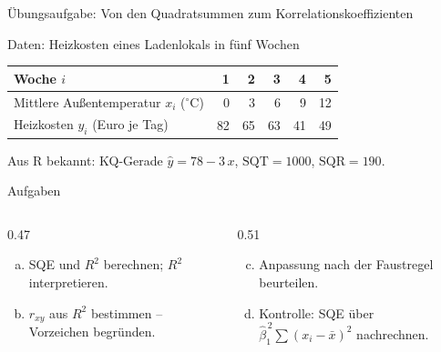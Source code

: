 \documentclass[aspectratio=169,11pt]{beamer}
\begin{document}
\begin{frame}{Übungsaufgabe: Von den Quadratsummen zum Korrelationskoeffizienten}
  \begin{block}{Daten: Heizkosten eines Ladenlokals in fünf Wochen}
    \vspace{-2pt}
    \begin{center}
      \renewcommand{\arraystretch}{1.05}
      \begin{tabular}{l*{5}{r}}
        \toprule
        Woche $i$                                      & 1  & 2  & 3  & 4  & 5  \\
        \midrule
        Mittlere Außentemperatur $x_i$ ($^\circ$C)     & 0  & 3  & 6  & 9  & 12 \\
        Heizkosten $y_i$ (Euro je Tag)                 & 82 & 65 & 63 & 41 & 49 \\
        \bottomrule
      \end{tabular}
    \end{center}
    \vspace{-2pt}
    Aus R bekannt: KQ-Gerade $\hat{y} = 78 - 3\,x$, \quad $\text{SQT} = 1000$, \quad $\text{SQR} = 190$.
  \end{block}

  \begin{exampleblock}{Aufgaben}
    \begin{columns}[T]
      \begin{column}{0.47\textwidth}
        \begin{enumerate}[a)]
          \item SQE und $R^{2}$ berechnen; $R^{2}$ interpretieren.
          \item $r_{xy}$ aus $R^{2}$ bestimmen -- Vorzeichen begründen.
        \end{enumerate}
      \end{column}
      \begin{column}{0.51\textwidth}
        \begin{enumerate}[a)]
          \setcounter{enumi}{2}
          \item Anpassung nach der Faustregel beurteilen.
          \item Kontrolle: SQE über $\hat{\beta}_1^{\,2} \sum (x_i - \bar{x})^{2}$ nachrechnen.
        \end{enumerate}
      \end{column}
    \end{columns}
  \end{exampleblock}
\end{frame}
\end{document}
